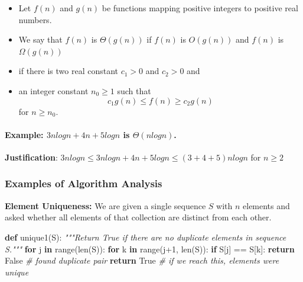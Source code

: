 \documentclass[11pt]{article}
\providecommand{\tightlist}{%
      \setlength{\itemsep}{0pt}\setlength{\parskip}{0pt}}
\newenvironment{Shaded}{}{}
\newcommand{\KeywordTok}[1]{\textcolor[rgb]{0.00,0.44,0.13}{\textbf{{#1}}}}
\newcommand{\DecValTok}[1]{\textcolor[rgb]{0.25,0.63,0.44}{{#1}}}
\newcommand{\CommentTok}[1]{\textcolor[rgb]{0.38,0.63,0.69}{\textit{{#1}}}}
\newcommand{\NormalTok}[1]{{#1}}
\newcommand{\VariableTok}[1]{\textcolor[rgb]{0.10,0.09,0.49}{{#1}}}
\newcommand{\ControlFlowTok}[1]{\textcolor[rgb]{0.00,0.44,0.13}{\textbf{{#1}}}}
\newcommand{\OperatorTok}[1]{\textcolor[rgb]{0.40,0.40,0.40}{{#1}}}
\newcommand{\BuiltInTok}[1]{{#1}}
\begin{document}
\begin{itemize}
\tightlist
\item
  Let \(f(n)\) and \(g(n)\) be functions mapping positive integers to
  positive real numbers.
\item
  We say that \(f(n)\) is \(\Theta(g(n))\) if \(f(n)\) is \(O(g(n))\)
  and \(f(n)\) is \(\Omega(g(n))\)
\item
  if there is two real constant \(c_1 > 0\) and \(c_2 > 0\) and
\item
  an integer constant \(n_0 \ge 1\) such that \[
  c_1g(n) \le f(n)\ge c_2g(n) 
  \] for \(n\ge n_0\).
\end{itemize}

    \hypertarget{example-3nlogn4n5logn-is-thetanlogn.}{%
\paragraph{\texorpdfstring{Example: \(3nlogn+4n+5logn\) is
\(\Theta(nlogn)\).}{Example: 3nlogn+4n+5logn is \textbackslash Theta(nlogn).}}\label{example-3nlogn4n5logn-is-thetanlogn.}}

\textbf{Justification}: \(3nlogn \le 3nlogn+4n+5logn \le (3+4+5)nlogn\)
for \(n \ge 2\)

    \hypertarget{examples-of-algorithm-analysis}{%
\subsubsection{Examples of Algorithm
Analysis}\label{examples-of-algorithm-analysis}}

\textbf{Element Uniqueness:} We are given a single sequence \(S\) with
\(n\) elements and asked whether all elements of that collection are
distinct from each other.

    \begin{Shaded}
\begin{Highlighting}[]
\KeywordTok{def}\NormalTok{ unique1(S):}
  \CommentTok{"""Return True if there are no duplicate elements in sequence S."""}
  \ControlFlowTok{for}\NormalTok{ j }\KeywordTok{in} \BuiltInTok{range}\NormalTok{(}\BuiltInTok{len}\NormalTok{(S)):}
    \ControlFlowTok{for}\NormalTok{ k }\KeywordTok{in} \BuiltInTok{range}\NormalTok{(j}\OperatorTok{+}\DecValTok{1}\NormalTok{, }\BuiltInTok{len}\NormalTok{(S)):}
      \ControlFlowTok{if}\NormalTok{ S[j] }\OperatorTok{==}\NormalTok{ S[k]:}
        \ControlFlowTok{return} \VariableTok{False}              \CommentTok{\# found duplicate pair}
  \ControlFlowTok{return} \VariableTok{True}                     \CommentTok{\# if we reach this, elements were unique}
\end{Highlighting}
\end{Shaded}
\end{document}
